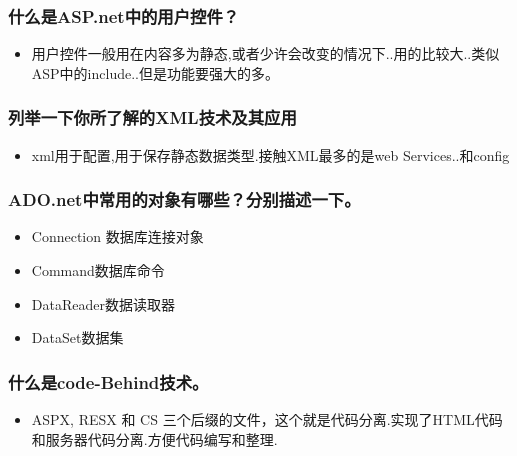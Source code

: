 \documentclass[9pt, b5paper]{article}
\begin{document}
\subsubsection{什么是ASP.net中的用户控件？}
\label{sec-1-1-71}
\begin{itemize}
\item 用户控件一般用在内容多为静态,或者少许会改变的情况下..用的比较大..类似ASP中的include..但是功能要强大的多。
\end{itemize}
\subsubsection{列举一下你所了解的XML技术及其应用}
\label{sec-1-1-72}
\begin{itemize}
\item xml用于配置,用于保存静态数据类型.接触XML最多的是web Services..和config
\end{itemize}
\subsubsection{ADO.net中常用的对象有哪些？分别描述一下。}
\label{sec-1-1-73}
\begin{itemize}
\item Connection 数据库连接对象
\item Command数据库命令
\item DataReader数据读取器
\item DataSet数据集
\end{itemize}
\subsubsection{什么是code-Behind技术。}
\label{sec-1-1-74}
\begin{itemize}
\item ASPX, RESX 和 CS 三个后缀的文件，这个就是代码分离.实现了HTML代码和服务器代码分离.方便代码编写和整理.
\end{itemize}
\end{document}
